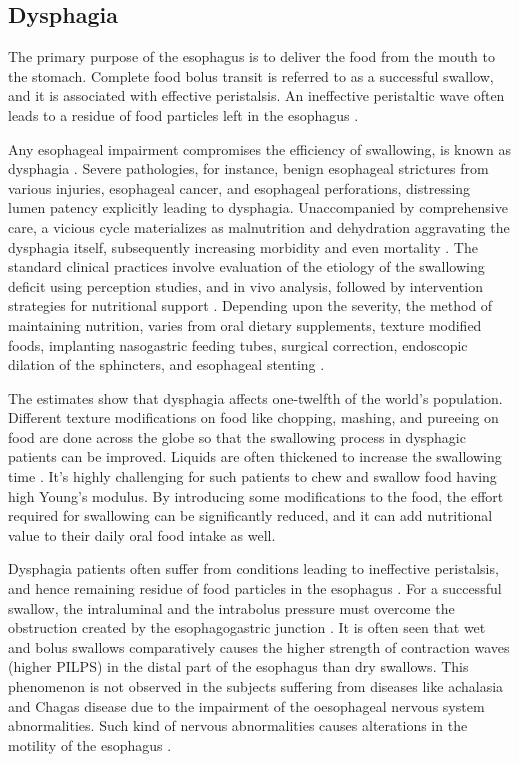 \subsection{Dysphagia}

The primary purpose of the esophagus is to deliver the food from the mouth to the stomach. Complete food bolus transit is referred to as a successful swallow, and it is associated with effective peristalsis. An ineffective peristaltic wave often leads to a residue of food particles left in the esophagus \cite{ren1993determinants}. 

Any esophageal impairment compromises the efficiency of swallowing, is known as dysphagia \cite{Dodds1989}. Severe pathologies, for instance, benign esophageal strictures from various injuries, esophageal cancer, and esophageal perforations, distressing lumen patency explicitly leading to dysphagia. Unaccompanied by comprehensive care, a vicious cycle materializes as malnutrition and dehydration aggravating the dysphagia itself, subsequently increasing morbidity and even mortality \cite{Groher2015}. The standard clinical practices involve evaluation of the etiology of the swallowing deficit using perception studies, and in vivo analysis, followed by intervention strategies for nutritional support \cite{Kuo2012}. Depending upon the severity, the method of maintaining nutrition, varies from oral dietary supplements, texture modified foods, implanting nasogastric feeding tubes, surgical correction, endoscopic dilation of the sphincters, and esophageal stenting \cite{Groher2015,Cichero2017}.


The estimates show that dysphagia affects one-twelfth of the world's population. Different texture modifications on food like chopping, mashing, and pureeing on food are done across the globe so that the swallowing process in dysphagic patients can be improved. Liquids are often thickened to increase the swallowing time \cite{Cichero2017}. It's highly challenging for such patients to chew and swallow food having high Young's modulus. By introducing some modifications to the food, the effort required for swallowing can be significantly reduced, and it can add nutritional value to their daily oral food intake as well. 

Dysphagia patients often suffer from conditions leading to ineffective peristalsis, and hence remaining residue of food particles in the esophagus \cite{Carrier2007Cognitive}.  For a successful swallow, the intraluminal and the intrabolus pressure must overcome the obstruction created by the esophagogastric junction \cite{jeong2014utilizing,ren1993determinants}. It is often seen that wet and bolus swallows comparatively causes the higher strength of contraction waves (higher \ac{PILPS}) in the distal part of the esophagus than dry swallows. This phenomenon is not observed in the subjects suffering from diseases like achalasia and Chagas disease due to the impairment of the oesophageal nervous system abnormalities. Such kind of nervous abnormalities causes alterations in the motility of the esophagus \cite{dalmazo2010esophageal}.

